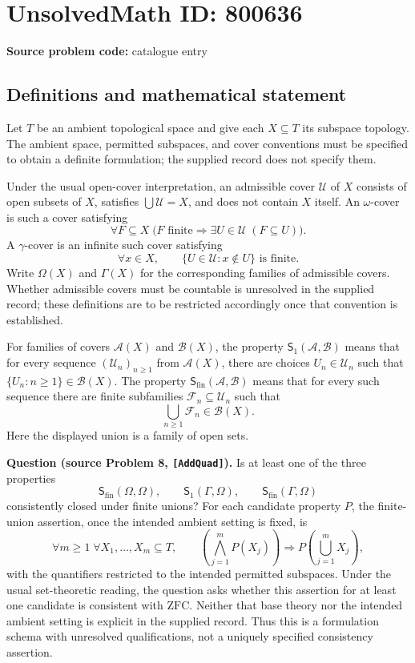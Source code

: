 \documentclass[11pt]{article}
\begin{document}
\section*{UnsolvedMath ID: 800636}
\textbf{Source problem code:} catalogue entry
\subsection{Definitions and mathematical statement}
Let \(T\) be an ambient topological space and give each \(X\subseteq T\) its subspace topology. The ambient space, permitted subspaces, and cover conventions must be specified to obtain a definite formulation; the supplied record does not specify them.

Under the usual open-cover interpretation, an admissible cover \(\mathcal U\) of \(X\) consists of open subsets of \(X\), satisfies \(\bigcup\mathcal U=X\), and does not contain \(X\) itself. An \(\omega\)-cover is such a cover satisfying
\[
\forall F\subseteq X\;\bigl(F\text{ finite}\Longrightarrow \exists U\in\mathcal U\;(F\subseteq U)\bigr).
\]
A \(\gamma\)-cover is an infinite such cover satisfying
\[
\forall x\in X,\qquad \{U\in\mathcal U:x\notin U\}\text{ is finite}.
\]
Write \(\Omega(X)\) and \(\Gamma(X)\) for the corresponding families of admissible covers. Whether admissible covers must be countable is unresolved in the supplied record; these definitions are to be restricted accordingly once that convention is established.

For families of covers \(\mathcal A(X)\) and \(\mathcal B(X)\), the property \(\mathsf S_1(\mathcal A,\mathcal B)\) means that for every sequence \((\mathcal U_n)_{n\geq1}\) from \(\mathcal A(X)\), there are choices \(U_n\in\mathcal U_n\) such that \(\{U_n:n\geq1\}\in\mathcal B(X)\). The property \(\mathsf S_{\mathrm{fin}}(\mathcal A,\mathcal B)\) means that for every such sequence there are finite subfamilies \(\mathcal F_n\subseteq\mathcal U_n\) such that
\[
\bigcup_{n\geq1}\mathcal F_n\in\mathcal B(X).
\]
Here the displayed union is a family of open sets.

\textbf{Question (source Problem 8, \texttt{[AddQuad]}).} Is at least one of the three properties
\[
\mathsf S_{\mathrm{fin}}(\Omega,\Omega),\qquad
\mathsf S_1(\Gamma,\Omega),\qquad
\mathsf S_{\mathrm{fin}}(\Gamma,\Omega)
\]
consistently closed under finite unions? For each candidate property \(P\), the finite-union assertion, once the intended ambient setting is fixed, is
\[
\forall m\geq1\;\forall X_1,\ldots,X_m\subseteq T,\qquad
\left(\bigwedge_{j=1}^{m}P(X_j)\right)
\Longrightarrow
P\!\left(\bigcup_{j=1}^{m}X_j\right),
\]
with the quantifiers restricted to the intended permitted subspaces. Under the usual set-theoretic reading, the question asks whether this assertion for at least one candidate is consistent with \(\mathrm{ZFC}\). Neither that base theory nor the intended ambient setting is explicit in the supplied record. Thus this is a formulation schema with unresolved qualifications, not a uniquely specified consistency assertion.
\end{document}
